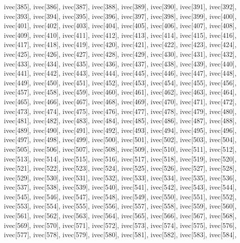 \begin{DoxyCode}
{  ivec[385],
  ivec[386],
  ivec[387],
  ivec[388],
  ivec[389],
  ivec[390],
  ivec[391],
  ivec[392],
  ivec[393],
  ivec[394],
  ivec[395],
  ivec[396],
  ivec[397],
  ivec[398],
  ivec[399],
  ivec[400],
  ivec[401],
  ivec[402],
  ivec[403],
  ivec[404],
  ivec[405],
  ivec[406],
  ivec[407],
  ivec[408],
  ivec[409],
  ivec[410],
  ivec[411],
  ivec[412],
  ivec[413],
  ivec[414],
  ivec[415],
  ivec[416],
  ivec[417],
  ivec[418],
  ivec[419],
  ivec[420],
  ivec[421],
  ivec[422],
  ivec[423],
  ivec[424],
  ivec[425],
  ivec[426],
  ivec[427],
  ivec[428],
  ivec[429],
  ivec[430],
  ivec[431],
  ivec[432],
  ivec[433],
  ivec[434],
  ivec[435],
  ivec[436],
  ivec[437],
  ivec[438],
  ivec[439],
  ivec[440],
  ivec[441],
  ivec[442],
  ivec[443],
  ivec[444],
  ivec[445],
  ivec[446],
  ivec[447],
  ivec[448],
  ivec[449],
  ivec[450],
  ivec[451],
  ivec[452],
  ivec[453],
  ivec[454],
  ivec[455],
  ivec[456],
  ivec[457],
  ivec[458],
  ivec[459],
  ivec[460],
  ivec[461],
  ivec[462],
  ivec[463],
  ivec[464],
  ivec[465],
  ivec[466],
  ivec[467],
  ivec[468],
  ivec[469],
  ivec[470],
  ivec[471],
  ivec[472],
  ivec[473],
  ivec[474],
  ivec[475],
  ivec[476],
  ivec[477],
  ivec[478],
  ivec[479],
  ivec[480],
  ivec[481],
  ivec[482],
  ivec[483],
  ivec[484],
  ivec[485],
  ivec[486],
  ivec[487],
  ivec[488],
  ivec[489],
  ivec[490],
  ivec[491],
  ivec[492],
  ivec[493],
  ivec[494],
  ivec[495],
  ivec[496],
  ivec[497],
  ivec[498],
  ivec[499],
  ivec[500],
  ivec[501],
  ivec[502],
  ivec[503],
  ivec[504],
  ivec[505],
  ivec[506],
  ivec[507],
  ivec[508],
  ivec[509],
  ivec[510],
  ivec[511],
  ivec[512],
  ivec[513],
  ivec[514],
  ivec[515],
  ivec[516],
  ivec[517],
  ivec[518],
  ivec[519],
  ivec[520],
  ivec[521],
  ivec[522],
  ivec[523],
  ivec[524],
  ivec[525],
  ivec[526],
  ivec[527],
  ivec[528],
  ivec[529],
  ivec[530],
  ivec[531],
  ivec[532],
  ivec[533],
  ivec[534],
  ivec[535],
  ivec[536],
  ivec[537],
  ivec[538],
  ivec[539],
  ivec[540],
  ivec[541],
  ivec[542],
  ivec[543],
  ivec[544],
  ivec[545],
  ivec[546],
  ivec[547],
  ivec[548],
  ivec[549],
  ivec[550],
  ivec[551],
  ivec[552],
  ivec[553],
  ivec[554],
  ivec[555],
  ivec[556],
  ivec[557],
  ivec[558],
  ivec[559],
  ivec[560],
  ivec[561],
  ivec[562],
  ivec[563],
  ivec[564],
  ivec[565],
  ivec[566],
  ivec[567],
  ivec[568],
  ivec[569],
  ivec[570],
  ivec[571],
  ivec[572],
  ivec[573],
  ivec[574],
  ivec[575],
  ivec[576],
  ivec[577],
  ivec[578],
  ivec[579],
  ivec[580],
  ivec[581],
  ivec[582],
  ivec[583],
  ivec[584],
}
\end{DoxyCode}
